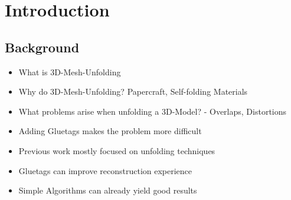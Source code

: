 \documentclass[draft,final]{vutinfth} %
\begin{document}
\frontmatter %

\addstatementpage

\begin{danksagung*}
\end{danksagung*}

\begin{acknowledgements*}
\end{acknowledgements*}

\begin{kurzfassung}
\end{kurzfassung}

\begin{abstract}
\end{abstract}


\tableofcontents %

\mainmatter

\chapter{Introduction}

\section{Background}

\begin{itemize}
	\item What is 3D-Mesh-Unfolding
	\item Why do 3D-Mesh-Unfolding? Papercraft, Self-folding Materials
	\item What problems arise when unfolding a 3D-Model? - Overlaps, Distortions
\end{itemize}

\begin{itemize}
	\item Adding Gluetags makes the problem more difficult
	\item Previous work mostly focused on unfolding techniques
	\item Gluetags can improve reconstruction experience
	\item Simple Algorithms can already yield good results
\end{itemize}
\end{document}
